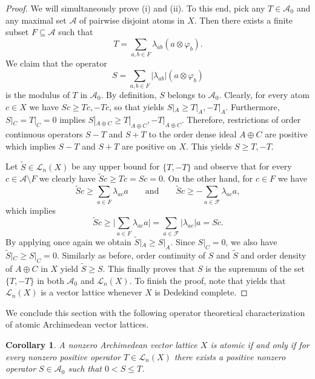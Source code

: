 \documentclass[12pt,reqno]{amsart}
\theoremstyle{plain}
\newtheorem{corollary}[theorem]{Corollary}
\theoremstyle{definition}
\begin{document}
\begin{proof}
We will simultaneously prove (i) and (ii).  To this end, pick any $T\in \mathscr A_0$ and any maximal set $\mathcal A$ of pairwise disjoint atoms in $X$. Then there exists a finite subset $F\subseteq \mathcal A$ such that 
$$T=\sum_{a,b\in  F} \lambda_{ab}(a\otimes \varphi_b).$$ We claim that the operator 
$$S=\sum_{a,b\in F} |\lambda_{ab}|(a\otimes \varphi_b)$$
is the modulus of $T$ in $\mathscr A_0$. By definition, $S$ belongs to $\mathscr A_0$. Clearly, for every atom $c\in X$ we have $Sc\geq Tc,-Tc$, so that  yields $S|_A\geq T|_A,-T|_A$. Furthermore,  $S|_C=T|_C=0$ implies 
$S|_{A\oplus C}\geq T|_{A\oplus C},-T|_{A\oplus C}$. Therefore, restrictions of order continuous operators $S-T$ and $S+T$ to the order dense ideal $A\oplus C$ are positive which implies $S-T$ and $S+T$ are positive on $X$. This yields $S\geq T,-T$. 

Let $\widetilde S\in \mathscr L_n(X)$ be any upper bound for $\{T,-T\}$ and observe that for every $c\in \mathcal A\setminus F$ we clearly have $\widetilde Sc\geq Tc=Sc=0$. On the other hand, for $c\in  F$ we have
$$\widetilde Sc\geq \sum_{a\in F}\lambda_{ac}a \qquad \textrm{and} \qquad \widetilde Sc\geq -\sum_{a\in \mathcal F}\lambda_{ac}a,$$ which implies 
$$\widetilde Sc\geq \bigg| \sum_{a\in  F}\lambda_{ac}a \bigg| = \sum_{a\in \mathcal F}|\lambda_{ac}|a=Sc.$$
By applying  once again we obtain $\widetilde S|_A \geq S|_A$. Since $S|_C=0$, we also have $\widetilde S|_C\geq S|_C=0$. Similarly as before, order continuity of $S$ and $\widetilde S$ and order density of $A\oplus C$ in $X$ yield $\widetilde S\geq S$. 
This finally proves that $S$ is the supremum of the set $\{T,-T\}$ in both $\mathscr A_0$ and $\mathscr L_n(X)$. To finish the proof, note that \cite[Theorem 1.56]{Aliprantis:06} yields that $\mathscr L_n(X)$ is a vector lattice whenever $X$ is Dedekind complete. 
\end{proof}
 
We conclude this section with the following operator theoretical characterization of atomic Archimedean vector lattices. 

\begin{corollary}
   A nonzero Archimedean vector lattice $X$ is atomic if and only if for every nonzero positive operator $T\in \mathscr L_n(X)$ there exists a positive nonzero operator $S\in \mathscr A_0$ such that $0<S\leq T$.  
\end{corollary} 
\end{document}
